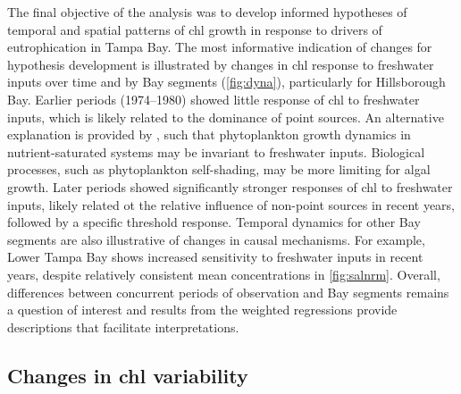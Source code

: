 \documentclass[letterpaper,12pt,oneside]{article}\usepackage[]{graphicx}\usepackage[]{color}
\begin{document}
The final objective of the analysis was to develop informed hypotheses of temporal and spatial patterns of \ac{chl} growth in response to drivers of eutrophication in Tampa Bay.  The most informative indication of changes for hypothesis development is illustrated by changes in \ac{chl} response to freshwater inputs over time and by Bay segments (\cref{fig:dyna}), particularly for Hillsborough Bay.  Earlier periods (1974--1980) showed little response of \ac{chl} to freshwater inputs, which is likely related to the dominance of point sources.  An alternative explanation is provided by \citet{Wofsy83}, such that phytoplankton growth dynamics in nutrient-saturated systems may be invariant to freshwater inputs.  Biological processes, such as phytoplankton self-shading, may be more limiting for algal growth.  Later periods showed significantly stronger responses of \ac{chl} to freshwater inputs, likely related ot the relative influence of non-point sources in recent years, followed by a specific threshold response. Temporal dynamics for other Bay segments are also illustrative of changes in causal mechanisms.  For example, Lower Tampa Bay shows increased sensitivity to freshwater inputs in recent years, despite relatively consistent mean concentrations in \cref{fig:salnrm}.  Overall, differences between concurrent periods of observation and Bay segments remains a question of interest and results from the weighted regressions provide descriptions that facilitate interpretations.

\subsection{Changes in \ac{chl} variability}
\end{document}
